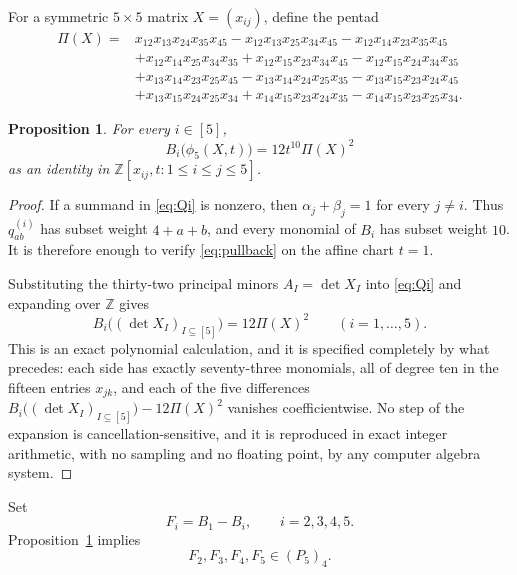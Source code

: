 \documentclass[11pt]{amsart}
\newtheorem{proposition}[theorem]{Proposition}
\theoremstyle{remark}
\begin{document}
For a symmetric \(5\times5\) matrix \(X=(x_{ij})\), define the pentad
\begin{align*}
\Pi(X)={}&
 x_{12}x_{13}x_{24}x_{35}x_{45}
-x_{12}x_{13}x_{25}x_{34}x_{45}
-x_{12}x_{14}x_{23}x_{35}x_{45}\\
&+x_{12}x_{14}x_{25}x_{34}x_{35}
+x_{12}x_{15}x_{23}x_{34}x_{45}
-x_{12}x_{15}x_{24}x_{34}x_{35}\\
&+x_{13}x_{14}x_{23}x_{25}x_{45}
-x_{13}x_{14}x_{24}x_{25}x_{35}
-x_{13}x_{15}x_{23}x_{24}x_{45}\\
&+x_{13}x_{15}x_{24}x_{25}x_{34}
+x_{14}x_{15}x_{23}x_{24}x_{35}
-x_{14}x_{15}x_{23}x_{25}x_{34}.
\end{align*}

\begin{proposition}\label{prop:pullback}
For every \(i\in[5]\),
\begin{equation}\label{eq:pullback}
  B_i\bigl(\phi_5(X,t)\bigr)=12t^{10}\Pi(X)^2
\end{equation}
as an identity in \(\mathbb Z[x_{ij},t:1\leq i\leq j\leq5]\).
\end{proposition}

\begin{proof}
If a summand in \eqref{eq:Qi} is nonzero, then
\(\alpha_j+\beta_j=1\) for every \(j\neq i\). Thus
\(q^{(i)}_{ab}\) has subset weight \(4+a+b\), and every monomial of
\(B_i\) has subset weight \(10\). It is therefore enough to verify
\eqref{eq:pullback} on the affine chart \(t=1\).

Substituting the thirty-two principal minors \(A_I=\det X_I\) into
\eqref{eq:Qi} and expanding over \(\mathbb Z\) gives
\[
  B_i\bigl((\det X_I)_{I\subseteq[5]}\bigr)=12\Pi(X)^2
  \qquad(i=1,\dots,5).
\]
This is an exact polynomial calculation, and it is specified completely by
what precedes: each side has exactly seventy-three monomials, all of degree
ten in the fifteen entries \(x_{jk}\), and each of the five differences
\(B_i\bigl((\det X_I)_{I\subseteq[5]}\bigr)-12\Pi(X)^2\) vanishes
coefficientwise. No step of the expansion is cancellation-sensitive, and it
is reproduced in exact integer arithmetic, with no sampling and no floating
point, by any computer algebra system.
\end{proof}

Set
\[
  F_i=B_1-B_i,
  \qquad i=2,3,4,5.
\]
Proposition~\ref{prop:pullback} implies
\begin{equation}\label{eq:membership}
  F_2,F_3,F_4,F_5\in(P_5)_4.
\end{equation}
\end{document}
